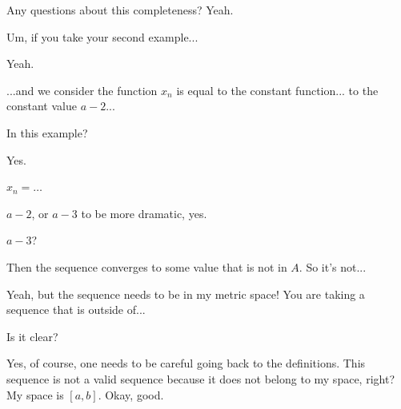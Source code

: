 \begin{speech}[00:58:51 - 00:59:16]
Any questions about this completeness? Yeah.
\end{speech}

\begin{student}
Um, if you take your second example...
\end{student}

\begin{speech}[00:59:25 - 00:59:26]
Yeah.
\end{speech}

\begin{student}
...and we consider the function $x_n$ is equal to the constant function... to the constant value $a - 2$...
\end{student}

\begin{speech}[00:59:37 - 00:59:38]
In this example? 
\end{speech}

\begin{student}
Yes.
\end{student}

\begin{speech}[00:59:40 - 00:59:41]
$x_n = \dots$
\end{speech}

\begin{student}
$a - 2$, or $a - 3$ to be more dramatic, yes.
\end{student}

\begin{speech}[00:59:47 - 00:59:48]
$a - 3$? 
\end{speech}

\begin{student}
Then the sequence converges to some value that is not in $A$. So it's not...
\end{student}

\begin{speech}[01:00:04 - 01:00:41]
Yeah, but the sequence needs to be in my metric space! You are taking a sequence that is outside of...


Is it clear?


Yes, of course, one needs to be careful going back to the definitions. This sequence is not a valid sequence because it does not belong to my space, right? My space is $[a, b]$. Okay, good.
\end{speech}


